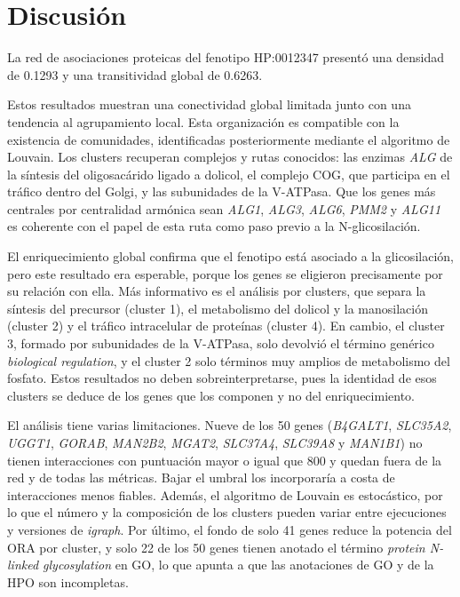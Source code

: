 \section{Discusión}

La red de asociaciones proteicas del fenotipo
HP:0012347 presentó una densidad de 0.1293
y una transitividad global de 0.6263.

Estos resultados muestran una conectividad global
limitada junto con una tendencia al agrupamiento
local. Esta organización es compatible con la
existencia de comunidades, identificadas
posteriormente mediante el algoritmo de Louvain.
Los clusters recuperan complejos y rutas conocidos: 
las enzimas \textit{ALG} de la síntesis del oligosacárido ligado
a dolicol, el complejo COG, que participa en el tráfico dentro
del Golgi, y las subunidades de la V-ATPasa. Que los genes más
centrales por centralidad armónica sean \textit{ALG1}, \textit{ALG3}, \textit{ALG6}, 
\textit{PMM2} y \textit{ALG11} es coherente con el papel de esta ruta como paso previo a 
la N-glicosilación.

El enriquecimiento global confirma que el fenotipo está asociado a la glicosilación, 
pero este resultado era esperable, porque los genes se eligieron precisamente por su
relación con ella. Más informativo es el análisis por clusters, que separa la síntesis
del precursor (cluster 1), el metabolismo del dolicol y la manosilación (cluster 2) 
y el tráfico intracelular de proteínas (cluster 4). En cambio, el cluster 3,
formado por subunidades de la V-ATPasa, solo devolvió el término genérico 
\textit{biological regulation}, y el cluster 2 solo términos muy amplios de metabolismo 
del fosfato. Estos resultados no deben sobreinterpretarse, pues la identidad de esos 
clusters se deduce de los genes que los componen y no del enriquecimiento.

El análisis tiene varias limitaciones. Nueve de los 50 genes 
(\textit{B4GALT1}, \textit{SLC35A2}, \textit{UGGT1}, \textit{GORAB}, \textit{MAN2B2},
\textit{MGAT2}, \textit{SLC37A4}, \textit{SLC39A8} y \textit{MAN1B1}) no tienen 
interacciones con puntuación mayor o igual que 800 y quedan fuera de la red y 
de todas las métricas. Bajar el umbral los incorporaría a costa de interacciones 
menos fiables. Además, el algoritmo de Louvain es estocástico, por lo que el número y 
la composición de los clusters pueden variar entre ejecuciones y versiones de 
\textit{igraph}. Por último, el fondo de solo 41 genes reduce la potencia del ORA por 
cluster, y solo 22 de los 50 genes tienen anotado el término 
\textit{protein N-linked glycosylation} en GO, lo que apunta a que las anotaciones de GO 
y de la HPO son incompletas.

